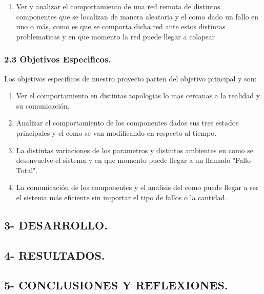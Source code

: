 \documentclass[12pt]{article}
\begin{document}
\begin{enumerate}
    \item Ver y analizar el comportamiento de una red remota de distintos componentes que se localizan de manera aleatoria y el como dado un fallo en uno o más, como es que se comporta dicha red ante estos distintas
    problematicas y en que momento la red puede llegar a colapsar 
\end{enumerate}

{\color{red} \subsubsection*{2.3 Objetivos Especificos.}}
\vspace{1em}

Los objetivos especificos de nuestro proyecto parten del objetivo principal y son:\\
\begin{enumerate}
    \item Ver el comportamiento en distintas topologias lo mas cercanas a la realidad y su comunicación.
    \item Analizar el comportamiento de los componentes dados sus tres estados principales y el como se van modificando en respecto al tiempo.
    \item La distintas variaciones de los parametros y distintos ambientes en como se desenvuelve el sistema y en que momento puede llegar a un llamado "Fallo Total".
    \item La comunicación de los componentes y el analisis del como puede llegar a ser el sistema más eficiente sin importar el tipo de fallos o la cantidad.
\end{enumerate}


{\color{blue} \subsection*{3- DESARROLLO.}}
\vspace{1em}

{\color{blue} \subsection*{4- RESULTADOS.}}
\vspace{1em}

{\color{blue} \subsection*{5- CONCLUSIONES Y REFLEXIONES.}}
\vspace{1em}
\end{document}
